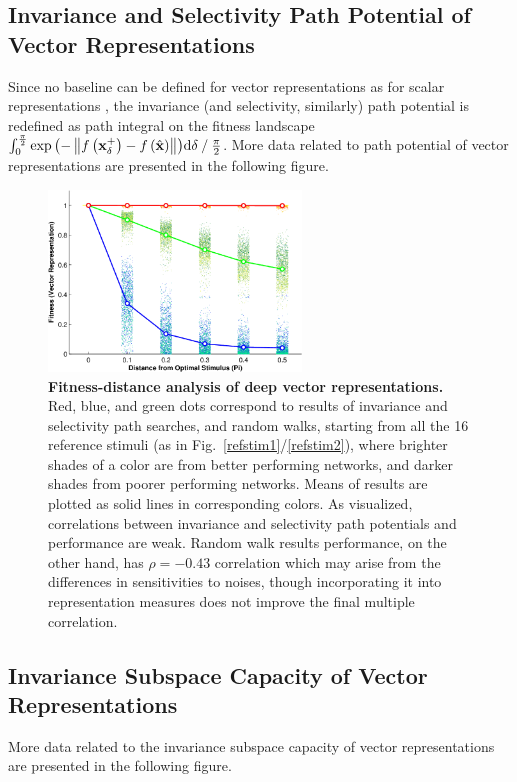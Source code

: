 \documentclass{article} %
\begin{document}
\clearpage

\subsection{Invariance and Selectivity Path Potential of Vector Representations}
Since no baseline can be defined for vector representations as for scalar representations , the invariance (and selectivity, similarly) path potential is redefined as path integral on the fitness landscape $\int_{0}^{\frac{\pi}{2}}{\exp\left(-\left\|f\left(\bf{x}^{+}_{\delta}\right)-f\left(\hat{\bf{x}}\right)\right\|\right)}\mathrm{d}\delta \mathbin{/} {\frac{\pi}{2}}$.
More data related to path potential of vector representations are presented in the following figure.

\begin{figure}[H]
\centering \includegraphics[width=0.60\textwidth]{Figs_supp/e_fig5a-crop.pdf}
\caption{ 
{\bf Fitness-distance analysis of deep vector representations.} Red, blue, and green dots correspond to results of invariance and selectivity path searches, and random walks, starting from all the 16 reference stimuli (as in Fig.~\ref{refstim1}/\ref{refstim2}), where brighter shades of a color are from better performing networks, and darker shades from poorer performing networks. Means of results are plotted as solid lines in corresponding colors. As visualized, correlations between invariance and selectivity path potentials and performance are weak. Random walk results \vs performance, on the other hand, has $\rho = -0.43$ correlation which may arise from the differences in sensitivities to noises, though incorporating it into representation measures does not improve the final multiple correlation.}
\end{figure}

\subsection{Invariance Subspace Capacity of Vector Representations}
More data related to the invariance subspace capacity of vector representations are presented in the following figure.
\end{document}
